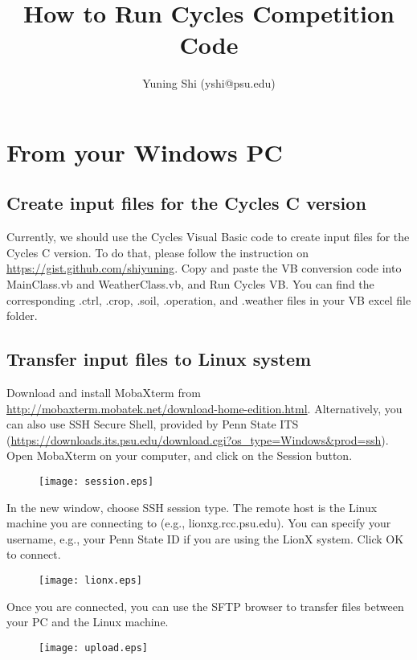 \documentclass[11pt]{article}
\begin{document}
\title{How to Run Cycles Competition Code}
\author{Yuning Shi (yshi@psu.edu)}
\maketitle

\section{From your Windows PC}
\subsection{Create input files for the Cycles C version}
Currently, we should use the Cycles Visual Basic code to create input files for the Cycles C version.
To do that, please follow the instruction on \url{https://gist.github.com/shiyuning}.
Copy and paste the VB conversion code into MainClass.vb and WeatherClass.vb, and Run Cycles VB.
You can find the corresponding .ctrl, .crop, .soil, .operation, and .weather files in your VB excel file folder.

\subsection{Transfer input files to Linux system}
Download and install MobaXterm from \url{http://mobaxterm.mobatek.net/download-home-edition.html}.
Alternatively, you can also use SSH Secure Shell, provided by Penn State ITS (\url{https://downloads.its.psu.edu/download.cgi?os\_type=Windows\&prod=ssh}).
Open MobaXterm on your computer, and click on the Session button.
\begin{figure}[htb]
  \centering
  \texttt{[image: session.eps]}
\end{figure}

In the new window, choose SSH session type. The remote host is the Linux machine you are connecting to (e.g., lionxg.rcc.psu.edu).
You can specify your username, e.g., your Penn State ID if you are using the LionX system.
Click OK to connect.
\begin{figure}[htb]
  \centering
  \texttt{[image: lionx.eps]}
\end{figure}

Once you are connected, you can use the SFTP browser to transfer files between your PC and the Linux machine.
\begin{figure}[htb]
  \centering
  \texttt{[image: upload.eps]}
\end{figure}
\end{document}
